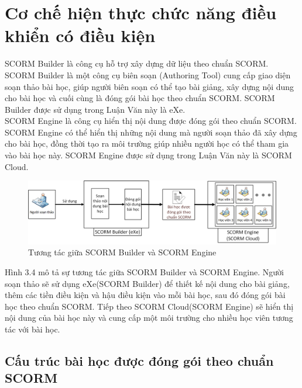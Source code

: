 \section{Cơ chế hiện thực chức năng điều khiển có điều kiện}

	SCORM Builder là công cụ hỗ trợ xây dựng dữ liệu theo chuẩn SCORM. SCORM Builder là một công cụ biên soạn (Authoring Tool) cung cấp giao diện soạn thảo bài học, giúp người biên soạn có thể tạo bài giảng, xây dựng nội dung cho bài học và cuối cùng là đóng gói bài học theo chuẩn SCORM. SCORM Builder được sử dụng trong Luận Văn này là eXe.\\
	
	SCORM Engine là công cụ hiển thị nội dung được đóng gói theo chuẩn SCORM. SCORM Engine có thể hiển thị những nội dung mà người soạn thảo đã xây dựng cho bài học, đồng thời tạo ra môi trường giúp nhiều người học có thể tham gia vào bài học này. SCORM Engine được sử dụng trong Luận Văn này là SCORM Cloud.

	
	\begin{center}
	\begin{figure}[htp]
		\begin{center}
			\includegraphics[width=15cm]{Chapter3/Pictures/picture34.png}
		\end{center}
		\caption{Tương tác giữa SCORM Builder và SCORM Engine}
		\label{refpicture45}
	\end{figure}
\end{center}

Hình 3.4 mô tả sự tương tác giữa SCORM Builder và SCORM Engine. Người soạn thảo sẽ sử dụng eXe(SCORM Builder) để thiết kế nội dung cho bài giảng, thêm các tiền điều kiện và hậu điều kiện vào mỗi bài học, sau đó đóng gói bài học theo chuẩn SCORM. Tiếp theo SCORM Cloud(SCORM Engine) sẽ hiển thị nội dung của bài học này và cung cấp một môi trường cho nhiều học viên tương tác với bài học.

\newpage

\subsection{Cấu trúc bài học được đóng gói theo chuẩn SCORM}

